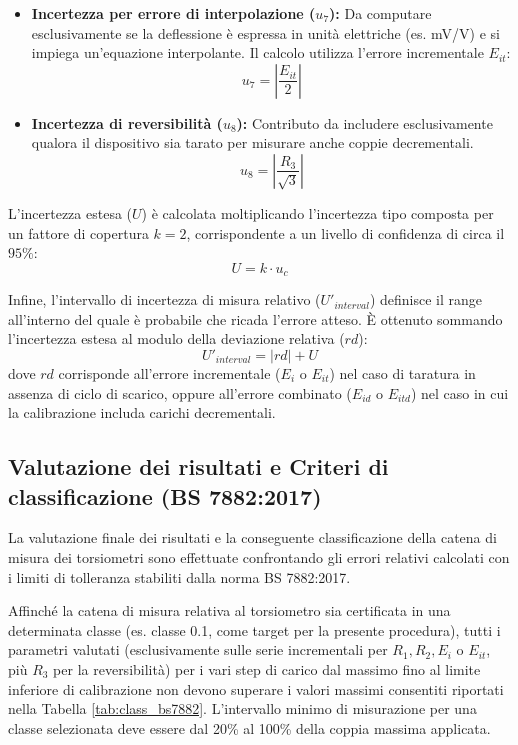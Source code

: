 \documentclass[a4paper, twoside]{article}
\begin{document}
\begin{itemize}
    \item \textbf{Incertezza per errore di interpolazione ($u_7$):} Da computare esclusivamente se la deflessione è espressa in unità elettriche (es. mV/V) e si impiega un'equazione interpolante. Il calcolo utilizza l'errore incrementale $E_{it}$:
    \begin{equation}
        u_7 = \left| \frac{E_{it}}{2} \right|
    \end{equation}

    \item \textbf{Incertezza di reversibilità ($u_8$):} Contributo da includere esclusivamente qualora il dispositivo sia tarato per misurare anche coppie decrementali.
    \begin{equation}
        u_8 = \left| \frac{R_3}{\sqrt{3}} \right|
    \end{equation}
\end{itemize}

L'incertezza estesa ($U$) è calcolata moltiplicando l'incertezza tipo composta per un fattore di copertura $k=2$, corrispondente a un livello di confidenza di circa il $95\%$:
\begin{equation}
    U = k \cdot u_c
\end{equation}

Infine, l'intervallo di incertezza di misura relativo ($U'_{interval}$) definisce il range all'interno del quale è probabile che ricada l'errore atteso. È ottenuto sommando l'incertezza estesa al modulo della deviazione relativa ($rd$):
\begin{equation}
    U'_{interval} = |rd| + U
\end{equation}
dove $rd$ corrisponde all'errore incrementale ($E_i$ o $E_{it}$) nel caso di taratura in assenza di ciclo di scarico, oppure all'errore combinato ($E_{id}$ o $E_{itd}$) nel caso in cui la calibrazione includa carichi decrementali.

\subsection{Valutazione dei risultati e Criteri di classificazione (BS 7882:2017)}

La valutazione finale dei risultati e la conseguente classificazione della catena di misura dei torsiometri sono effettuate confrontando gli errori relativi calcolati con i limiti di tolleranza stabiliti dalla norma BS 7882:2017.

Affinché la catena di misura relativa al torsiometro sia certificata in una determinata classe (es. classe 0.1, come target per la presente procedura), tutti i parametri valutati (esclusivamente sulle serie incrementali per $R_1, R_2, E_i$ o $E_{it}$, più $R_3$ per la reversibilità) per i vari step di carico dal massimo fino al limite inferiore di calibrazione non devono superare i valori massimi consentiti riportati nella Tabella \ref{tab:class_bs7882}. L'intervallo minimo di misurazione per una classe selezionata deve essere dal 20\% al 100\% della coppia massima applicata. 
\end{document}
